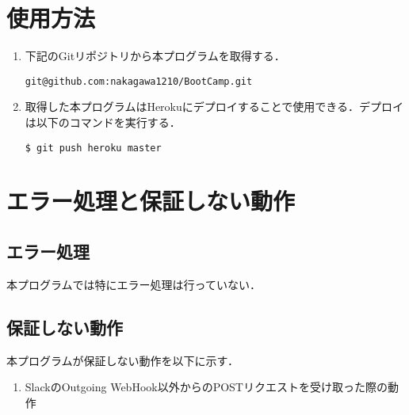 \documentclass[12pt]{jsarticle}
\begin{document}
\section{使用方法}
\begin{enumerate}
\item 下記のGitリポジトリから本プログラムを取得する．
\begin{verbatim}
git@github.com:nakagawa1210/BootCamp.git
  \end{verbatim}
  \item 取得した本プログラムはHerokuにデプロイすることで使用できる．デプロイは以下のコマンドを実行する．
\begin{verbatim}
$ git push heroku master
\end{verbatim}
\end{enumerate}

\section{エラー処理と保証しない動作}
\subsection{エラー処理}
本プログラムでは特にエラー処理は行っていない．

\subsection{保証しない動作}
本プログラムが保証しない動作を以下に示す．
\begin{enumerate}
\item SlackのOutgoing WebHook以外からのPOSTリクエストを受け取った際の動作
\end{enumerate}



\end{document}
